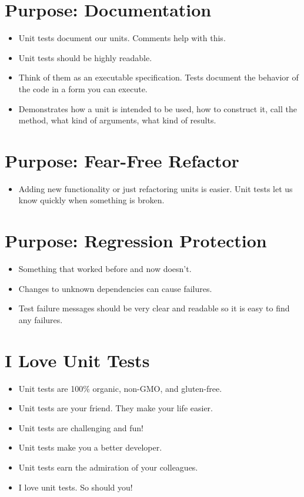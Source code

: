 \documentclass{article}
\begin{document}
\newpage
\section{Purpose: Documentation}
\begin{itemize}
    \item Unit tests document our units. Comments help with this.
    \item Unit tests should be highly readable.
    \item Think of them as an executable specification. Tests document the
        behavior of the code in a form you can execute.
    \item Demonstrates how a unit is intended to be used, how to construct
        it, call the method, what kind of arguments, what kind of results.
\end{itemize}

\newpage
\section{Purpose: Fear-Free Refactor}
\begin{itemize}
    \item Adding new functionality or just refactoring units is easier. Unit
        tests let us know quickly when something is broken.
\end{itemize}

\newpage
\section{Purpose: Regression Protection}
\begin{itemize}
    \item Something that worked before and now doesn't.
    \item Changes to unknown dependencies can cause failures.
    \item Test failure messages should be very clear and readable so it is
        easy to find any failures.
\end{itemize}

\newpage
\section{I Love Unit Tests}
\begin{itemize}
    \item Unit tests are 100\% organic, non-GMO, and gluten-free.
    \item Unit tests are your friend. They make your life easier.
    \item Unit tests are challenging and fun!
    \item Unit tests make you a better developer.
    \item Unit tests earn the admiration of your colleagues.
    \item I love unit tests. So should you!
\end{itemize}
\end{document}
